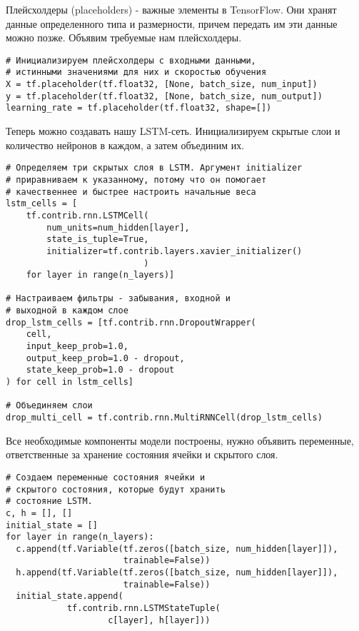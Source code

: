\documentclass[12pt, a4paper]{article}
\begin{document}
Плейсхолдеры (placeholders) - важные элементы в TensorFlow. Они хранят данные определенного типа и размерности, причем передать им эти данные можно позже. Объявим требуемые нам плейсхолдеры.

\begin{verbatim}
# Инициализируем плейсхолдеры с входными данными,
# истинными значениями для них и скоростью обучения
X = tf.placeholder(tf.float32, [None, batch_size, num_input])
y = tf.placeholder(tf.float32, [None, batch_size, num_output])
learning_rate = tf.placeholder(tf.float32, shape=[])
\end{verbatim}

Теперь можно создавать нашу LSTM-сеть. Инициализируем скрытые слои и количество нейронов в каждом, а затем объединим их.

\begin{verbatim}
# Определяем три скрытых слоя в LSTM. Аргумент initializer
# приравниваем к указанному, потому что он помогает
# качественнее и быстрее настроить начальные веса
lstm_cells = [
    tf.contrib.rnn.LSTMCell(
        num_units=num_hidden[layer],
        state_is_tuple=True,
        initializer=tf.contrib.layers.xavier_initializer()
                           )
    for layer in range(n_layers)]

# Настраиваем фильтры - забывания, входной и
# выходной в каждом слое
drop_lstm_cells = [tf.contrib.rnn.DropoutWrapper(
    cell,
    input_keep_prob=1.0,
    output_keep_prob=1.0 - dropout,
    state_keep_prob=1.0 - dropout
) for cell in lstm_cells]

# Объединяем слои
drop_multi_cell = tf.contrib.rnn.MultiRNNCell(drop_lstm_cells)
\end{verbatim}

Все необходимые компоненты модели построены, нужно объявить переменные, ответственные за хранение состояния ячейки и скрытого слоя.

\begin{verbatim}
# Создаем переменные состояния ячейки и
# скрытого состояния, которые будут хранить
# состояние LSTM.
c, h = [], []
initial_state = []
for layer in range(n_layers):
  c.append(tf.Variable(tf.zeros([batch_size, num_hidden[layer]]),
                       trainable=False))
  h.append(tf.Variable(tf.zeros([batch_size, num_hidden[layer]]),
                       trainable=False))
  initial_state.append(
			tf.contrib.rnn.LSTMStateTuple(
					c[layer], h[layer]))
\end{verbatim}
\end{document}

